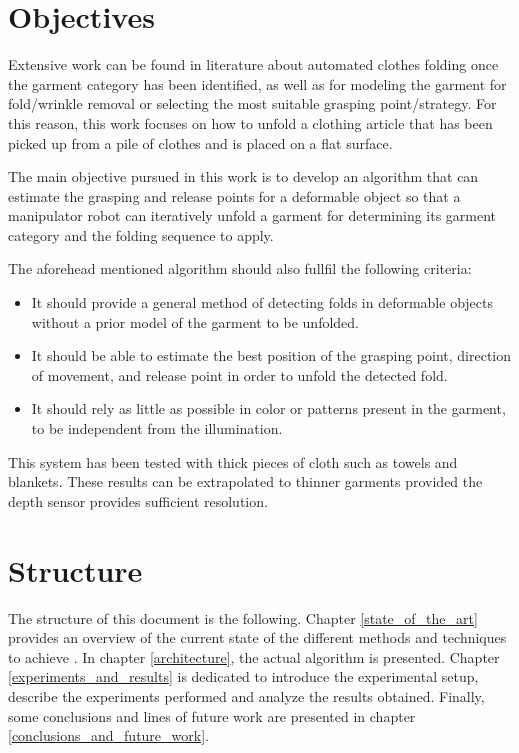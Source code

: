 \section{Objectives}
\label{intro_objectives}
Extensive work can be found in literature about automated clothes folding once the garment category has been identified, as well as for modeling the garment for fold/wrinkle removal or selecting the most suitable grasping point/strategy. For this reason, this work focuses on how to unfold a clothing article that has been picked up from a pile of clothes and is placed on a flat surface.

The main objective pursued in this work is to develop an algorithm that can estimate the grasping and release points for a deformable object so that a manipulator robot can iteratively unfold a garment for determining its garment category and the folding sequence to apply.

The aforehead mentioned algorithm should also fullfil the following criteria:

\begin{itemize}
	\item It should provide a general method of detecting folds in deformable objects without a prior model of the garment to be unfolded.
	\item It should be able to estimate the best position of the grasping point, direction of movement, and release point in order to unfold the detected fold.
	\item It should rely as little as possible in color or patterns present in the garment, to be independent from the illumination.
\end{itemize}

This system has been tested with thick pieces of cloth such as towels and blankets. These results can be extrapolated to thinner garments provided the depth sensor provides sufficient resolution.

\section{Structure}
\label{intro_structure}

The structure of this document is the following. Chapter \ref{state_of_the_art} provides an overview of the current state of the different methods and techniques to achieve . In chapter \ref{architecture}, the actual algorithm is presented. Chapter \ref{experiments_and_results} is dedicated to introduce the experimental setup, describe the experiments performed and analyze the results obtained. Finally, some conclusions and lines of future work are presented in chapter \ref{conclusions_and_future_work}.